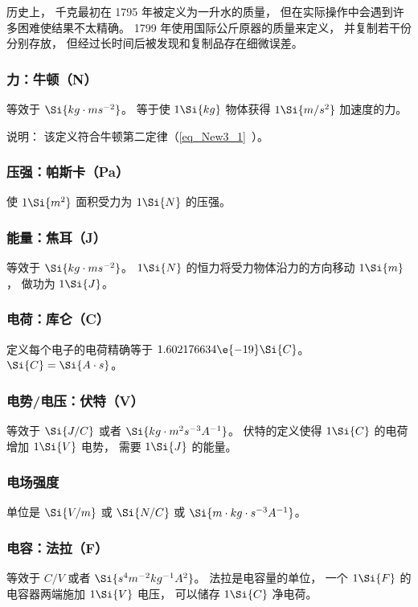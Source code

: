 历史上， 千克最初在 1795 年被定义为一升水的质量， 但在实际操作中会遇到许多困难使结果不太精确。 1799 年使用国际公斤原器的质量来定义， 并复制若干份分别存放， 但经过长时间后被发现和复制品存在细微误差。

\subsubsection{力：牛顿（N）}
等效于 $\Si{kg \cdot m s^{-2}}$。 等于使 $1\Si{kg}$ 物体获得 $1\Si{m/s^2}$ 加速度的力。

说明： 该定义符合牛顿第二定律（\autoref{eq_New3_1}~）。

\subsubsection{压强：帕斯卡（Pa）}
使 $1\Si{m^2}$ 面积受力为 $1\Si{N}$ 的压强。

\subsubsection{能量：焦耳（J）}
等效于 $\Si{kg\cdot ms^{-2}}$。 $1\Si{N}$ 的恒力将受力物体沿力的方向移动 $1\Si{m}$， 做功为 $1\Si{J}$。

\subsubsection{电荷：库仑（C）}
定义每个电子的电荷精确等于 $1.602176634\e{-19} \Si{C}$。 $\Si{C} = \Si{A\cdot s}$。

\subsubsection{电势/电压：伏特（V）}
等效于 $\Si{J/C}$ 或者 $\Si{kg\cdot m^2 s^{-3} A^{-1}}$。 伏特的定义使得 $1\Si{C}$ 的电荷增加 $1\Si{V}$ 电势， 需要 $1\Si{J}$ 的能量。

\subsubsection{电场强度}
单位是 $\Si{V/m}$ 或 $\Si{N/C}$ 或 $\Si{m\cdot kg \cdot s^{-3} A^{-1}}$。

\subsubsection{电容：法拉（F）}
等效于 $C/V$ 或者 $\Si{s^4 m^{-2} kg^{-1} A^2}$。 法拉是电容量的单位， 一个 $1\Si{F}$ 的电容器两端施加 $1\Si{V}$ 电压， 可以储存 $1\Si{C}$ 净电荷。

